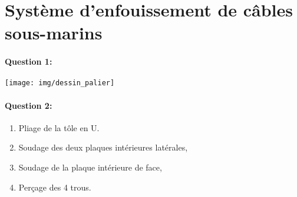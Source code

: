 \section{Système d'enfouissement de câbles sous-marins}

\paragraph{Question 1:}

\begin{center}
\texttt{[image: img/dessin\_palier]}
\end{center}

\paragraph{Question 2:}

\begin{enumerate}
 \item Pliage de la tôle en U.
 \item Soudage des deux plaques intérieures latérales,
 \item Soudage de la plaque intérieure de face,
 \item Perçage des 4 trous.
\end{enumerate}


